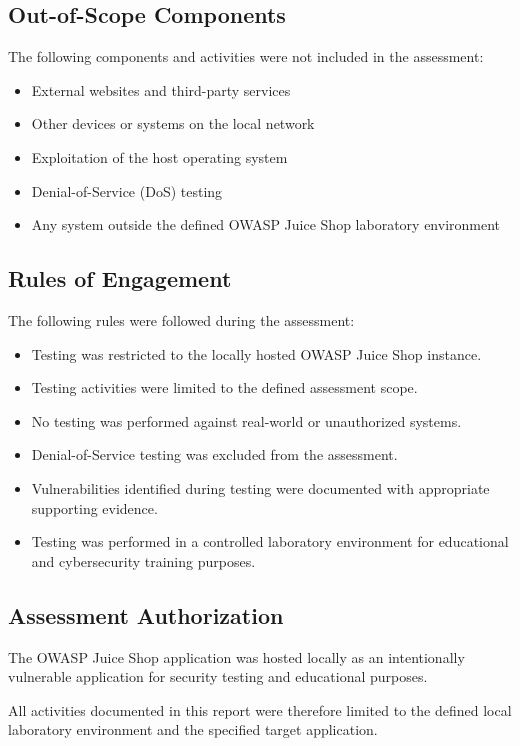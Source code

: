 \subsection{Out-of-Scope Components}

The following components and activities were not included in the
assessment:

\begin{itemize}
    \item External websites and third-party services
    \item Other devices or systems on the local network
    \item Exploitation of the host operating system
    \item Denial-of-Service (DoS) testing
    \item Any system outside the defined OWASP Juice Shop laboratory
    environment
\end{itemize}

\subsection{Rules of Engagement}

The following rules were followed during the assessment:

\begin{itemize}
    \item Testing was restricted to the locally hosted OWASP Juice
    Shop instance.

    \item Testing activities were limited to the defined assessment
    scope.

    \item No testing was performed against real-world or unauthorized
    systems.

    \item Denial-of-Service testing was excluded from the assessment.

    \item Vulnerabilities identified during testing were documented
    with appropriate supporting evidence.

    \item Testing was performed in a controlled laboratory environment
    for educational and cybersecurity training purposes.
\end{itemize}

\subsection{Assessment Authorization}

The OWASP Juice Shop application was hosted locally as an
intentionally vulnerable application for security testing and
educational purposes.

All activities documented in this report were therefore limited to
the defined local laboratory environment and the specified target
application.